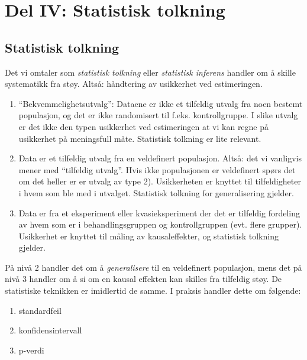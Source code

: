 \documentclass[
  norsk,
  letterpaper,
  DIV=11,
  numbers=noendperiod]{scrreprt}
\providecommand{\tightlist}{%
  \setlength{\itemsep}{0pt}\setlength{\parskip}{0pt}}
\theoremstyle{definition}
\theoremstyle{remark}
\begin{document}
\part{Del IV: Statistisk tolkning}

\chapter{Statistisk tolkning}\label{statistisk-tolkning}

Det vi omtaler som \emph{statistisk tolkning} eller \emph{statistisk
inferens} handler om å skille systematikk fra støy. Altså: håndtering av
usikkerhet ved estimeringen.

\begin{enumerate}
\def\labelenumi{\arabic{enumi})}
\tightlist
\item
  ``Bekvemmelighetsutvalg'': Dataene er ikke et tilfeldig utvalg fra
  noen bestemt populasjon, og det er ikke randomisert til f.eks.
  kontrollgruppe. I slike utvalg er det ikke den typen usikkerhet ved
  estimeringen at vi kan regne på usikkerhet på meningsfull måte.
  Statistisk tolkning er lite relevant.\\
\item
  Data er et tilfeldig utvalg fra en veldefinert populasjon. Altså: det
  vi vanligvis mener med ``tilfeldig utvalg''. Hvis ikke populasjonen er
  veldefinert spørs det om det heller er er utvalg av type 2).
  Usikkerheten er knyttet til tilfeldigheter i hvem som ble med i
  utvalget. Statistisk tolkning for generalisering gjelder.
\item
  Data er fra et eksperiment eller kvasieksperiment der det er tilfeldig
  fordeling av hvem som er i behandlingsgruppen og kontrollgruppen (evt.
  flere grupper). Usikkerhet er knyttet til måling av kausaleffekter, og
  statistisk tolkning gjelder.
\end{enumerate}

På nivå 2 handler det om å \emph{generalisere} til en veldefinert
populasjon, mens det på nivå 3 handler om å si om en kausal effekten kan
skilles fra tilfeldig støy. De statistiske teknikken er imidlertid de
samme. I praksis handler dette om følgende:

\begin{enumerate}
\def\labelenumi{\arabic{enumi})}
\tightlist
\item
  standardfeil
\item
  konfidensintervall
\item
  p-verdi
\end{enumerate}
\end{document}
